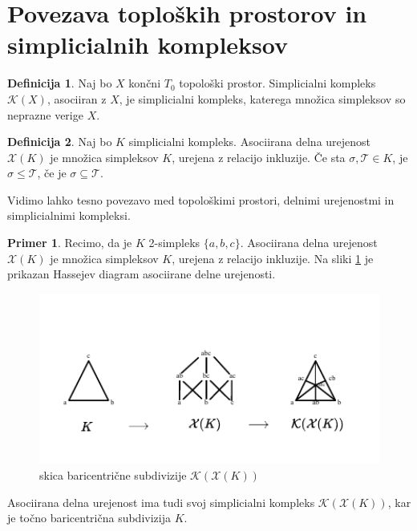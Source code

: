 \documentclass[a4paper, 12pt]{book}
\theoremstyle{definition}
\newtheorem{definition}{Definicija}[section]
\newtheorem{example}{Primer}[section]
\theoremstyle{remark}
\begin{document}
\section{Povezava toploških prostorov in simplicialnih kompleksov}
\begin{definition}
  Naj bo $X$ končni $T_0$ topološki prostor. Simplicialni kompleks $\mathcal{K}(X)$,
  asociiran z $X$, je simplicialni kompleks, katerega množica simpleksov so neprazne verige $X$.
\end{definition}
\begin{definition}\label{asociated-poset}
  Naj bo $K$ simplicialni kompleks. Asociirana delna urejenost $\mathcal{X}(K)$ je
  množica simpleksov $K$, urejena z relacijo inkluzije. Če sta $\sigma, \mathcal{T} \in K$,
  je $\sigma \leq \mathcal{T}$, če je $\sigma \subseteq \mathcal{T}$.
\end{definition}
Vidimo lahko tesno povezavo med topološkimi prostori, delnimi urejenostmi in
simplicialnimi kompleksi.
\begin{example}
Recimo, da je $K$ 2-simpleks $\{a,b,c\}$. Asociirana delna urejenost $\mathcal{X}(K)$
je množica simpleksov $K$, urejena z relacijo inkluzije. Na sliki \ref{baricent-asoc} je prikazan
Hassejev diagram asociirane delne urejenosti.
\begin{figure}[h]
  \begin{center}
  \includegraphics[width=1\textwidth]{baricent-asoc.pdf}
  \end{center}
  \caption{skica baricentrične subdivizije $\mathcal{K}(\mathcal{X}(K))$}
  \label{baricent-asoc}
\end{figure}
  Asociirana delna urejenost ima tudi
svoj simplicialni kompleks $\mathcal{K}(\mathcal{X}(K))$, kar je točno
baricentrična subdivizija $K$.
\end{example}
\end{document}
